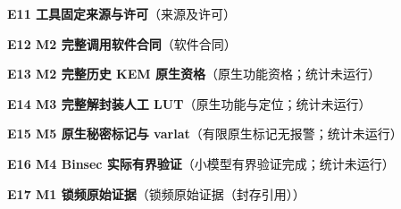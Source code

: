 \documentclass[UTF8,fontset=fandol,11pt,a4paper]{ctexart}
\begin{document}
\begin{samepage}\noindent\textbf{E11 工具固定来源与许可}（来源及许可）\par\noindent {}\par\vspace{1.5mm}\end{samepage}
\begin{samepage}\noindent\textbf{E12 M2 完整调用软件合同}（软件合同）\par\noindent {}\par\vspace{1.5mm}\end{samepage}
\begin{samepage}\noindent\textbf{E13 M2 完整历史 KEM 原生资格}（原生功能资格；统计未运行）\par\noindent {}\par\vspace{1.5mm}\end{samepage}
\begin{samepage}\noindent\textbf{E14 M3 完整解封装人工 LUT}（原生功能与定位；统计未运行）\par\noindent {}\par\vspace{1.5mm}\end{samepage}
\begin{samepage}\noindent\textbf{E15 M5 原生秘密标记与 varlat}（有限原生标记无报警；统计未运行）\par\noindent {}\par\vspace{1.5mm}\end{samepage}
\begin{samepage}\noindent\textbf{E16 M4 Binsec 实际有界验证}（小模型有界验证完成；统计未运行）\par\noindent {}\par\vspace{1.5mm}\end{samepage}
\begin{samepage}\noindent\textbf{E17 M1 锁频原始证据}（锁频原始证据（封存引用））\par\noindent {}\par\vspace{1.5mm}\end{samepage}
\end{document}
